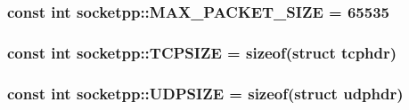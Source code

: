 \hypertarget{namespacesocketpp_11f9a39ced6614326ba993c3245d8912}{
\subsubsection[{MAX\_\-PACKET\_\-SIZE}]{\setlength{\rightskip}{0pt plus 5cm}const int {\bf socketpp::MAX\_\-PACKET\_\-SIZE} = 65535}}
\label{namespacesocketpp_11f9a39ced6614326ba993c3245d8912}


\hypertarget{namespacesocketpp_34c3bb51b882d2ae59d483d1e8faeebd}{
\subsubsection[{TCPSIZE}]{\setlength{\rightskip}{0pt plus 5cm}const int {\bf socketpp::TCPSIZE} = sizeof(struct tcphdr)}}
\label{namespacesocketpp_34c3bb51b882d2ae59d483d1e8faeebd}


\hypertarget{namespacesocketpp_1c4f449aef7a6c706b546343c4d16dd3}{
\subsubsection[{UDPSIZE}]{\setlength{\rightskip}{0pt plus 5cm}const int {\bf socketpp::UDPSIZE} = sizeof(struct udphdr)}}
\label{namespacesocketpp_1c4f449aef7a6c706b546343c4d16dd3}


